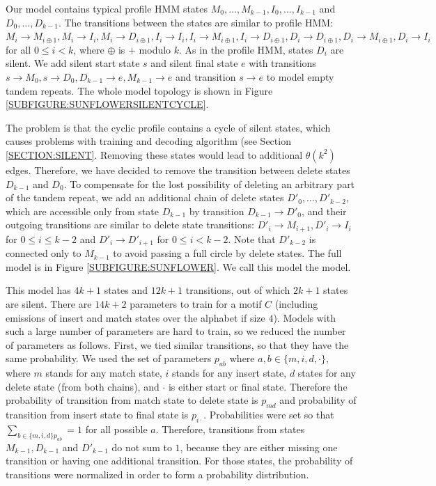 Our model contains typical profile HMM states $M_0,\dots, M_{k-1}, I_{0},
\dots, I_{k-1}$ and $D_{0}, \dots, D_{k-1}$. The transitions between the states
are similar to profile HMM:  $M_{i}\to M_{i\oplus 1}, M_i\to I_i, M_i\to
D_{i\oplus 1}, I_i\to I_i, I_i\to M_{i\oplus 1}, I_i\to D_{i\oplus 1}, D_{i}\to
D_{i \oplus 1}, D_{i}\to M_{i\oplus 1}, D_{i}\to I_i$ for all $0\leq i < k$,
where $\oplus$ is $+$ modulo $k$. As in the profile HMM, states $D_i$ are
silent. We add silent start state $s$ and silent final state $e$ with
transitions $s\to M_0, s\to D_0, D_{k-1}\to e, M_{k-1}\to e$ and transition
$s\to e$ to model empty tandem repeats. The whole model topology is shown in
Figure \ref{SUBFIGURE:SUNFLOWERSILENTCYCLE}.

The problem is that the cyclic profile contains a cycle of silent states, which
causes problems with training and decoding algorithm (see Section
\ref{SECTION:SILENT}. Removing these states would lead to additional
$\theta(k^2)$ edges. Therefore, we have decided to remove the transition
between delete states $D_{k-1}$ and $D_0$. To compensate for the lost
possibility of deleting an arbitrary part of the tandem repeat, we add an
additional chain of delete states $D'_0, \dots, D'_{k-2}$, which are accessible
only from state $D_{k-1}$ by transition $D_{k-1}\to D'_0$, and their outgoing
transitions are similar to delete state transitions: $D'_{i}\to M_{i+1},
D'_{i}\to I_i$ for $0\leq i\leq k-2$ and $D'_{i} \to D'_{i+1}$ for $0\leq i <
k-2$. Note that $D'_{k-2}$ is connected only to $M_{k-1}$ to avoid passing a
 full circle by delete states. The full model is in Figure
\ref{SUBFIGURE:SUNFLOWER}. We call this model the  model.

This model has $4k+1$ states and $12k+1$ transitions, out of which $2k+1$
states are silent. There are $14k+2$ parameters to train for a motif $C$
(including emissions of insert and match states over the alphabet if size $4$).
Models with such a large number of parameters are hard to train, so we reduced
the number of parameters as follows. First, we tied similar transitions, so
that they have the same probability.  We used the set of parameters $p_{ab}$
where $a,b\in \{m, i, d, \cdot\}$, where $m$ stands for any match state, $i$
stands for any insert state, $d$ states for any delete state (from both
chains), and $\cdot$ is either start or final state. Therefore the probability
of transition from match state to delete state is $p_{md}$ and probability of
transition from insert state to final state is $p_{i\cdot}$.  Probabilities
were set so that $\sum_{b\in\{m,i,d\} p_{ab}}=1$ for all possible $a$.
Therefore, transitions from states $M_{k-1}, D_{k-1}$ and $D'_{k-1}$ do not sum
to $1$, because they are either missing one transition or having one additional
transition. For those states, the probability of transitions were normalized in
order to form a probability distribution. 

